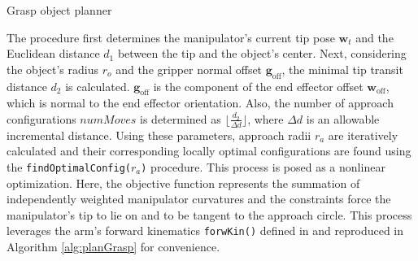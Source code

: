 \begin{algorithm}[!htbp]
\begin{small}
{  \KwRet{$\boldsymbol{\kappa}^*$} \; }
  \setcounter{AlgoLine}{0}
  \caption{Grasp object planner}
  \label{alg:planGrasp}
\end{small}

\end{algorithm}

The procedure first determines the manipulator's current tip pose $\mathbf{w}_t$ and the Euclidean distance $d_1$ between the tip and the object's center. 
Next, considering the object's radius $r_o$ and the gripper normal offset $\mathbf{g}_{\textrm{off}}$, the minimal tip transit distance $d_2$ is calculated. 
$\mathbf{g}_{\textrm{off}}$ is the component of the end effector offset $\mathbf{w}_{\textrm{off}}$, which is normal to the end effector orientation. 
Also, the number of approach configurations $numMoves$ is determined as $\lfloor \frac{d_2}{\Delta d} \rfloor$, where $\Delta d$ is an allowable incremental distance. 
Using these parameters, approach radii $r_a$ are iteratively calculated and their corresponding locally optimal configurations are found using the \texttt{findOptimalConfig($r_a$)} procedure. 
This process is posed as a nonlinear optimization. 
Here, the objective function represents the summation of independently weighted manipulator curvatures and the constraints force the manipulator's tip to lie on and to be tangent to the approach circle. 
This process leverages the arm's forward kinematics \texttt{forwKin()} defined in \cite{marchese2014design} and reproduced in Algorithm \ref{alg:planGrasp} for convenience.

